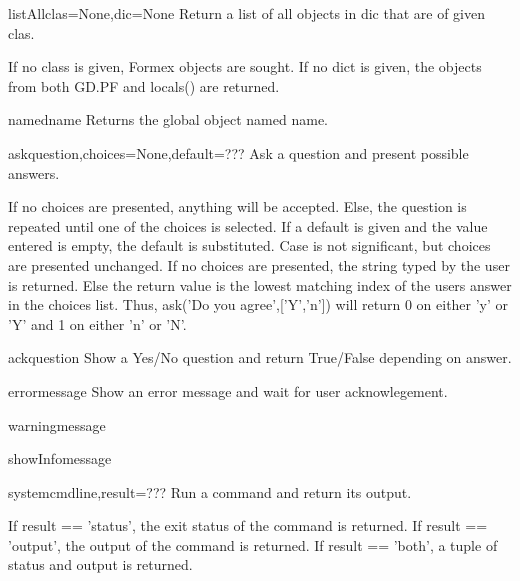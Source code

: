 \begin{funcdesc}{listAll}{clas=None,dic=None}
Return a list of all objects in dic that are of given clas.

    If no class is given, Formex objects are sought.
    If no dict is given, the objects from both GD.PF and locals()
    are returned.
    

\end{funcdesc}


\begin{funcdesc}{named}{name}
Returns the global object named name.

\end{funcdesc}


\begin{funcdesc}{ask}{question,choices=None,default=???}
Ask a question and present possible answers.

    If no choices are presented, anything will be accepted.
    Else, the question is repeated until one of the choices is selected.
    If a default is given and the value entered is empty, the default is
    substituted.
    Case is not significant, but choices are presented unchanged.
    If no choices are presented, the string typed by the user is returned.
    Else the return value is the lowest matching index of the users answer
    in the choices list. Thus, ask('Do you agree',['Y','n']) will return
    0 on either 'y' or 'Y' and 1 on either 'n' or 'N'.
    

\end{funcdesc}


\begin{funcdesc}{ack}{question}
Show a Yes/No question and return True/False depending on answer.

\end{funcdesc}


\begin{funcdesc}{error}{message}
Show an error message and wait for user acknowlegement.

\end{funcdesc}


\begin{funcdesc}{warning}{message}


\end{funcdesc}


\begin{funcdesc}{showInfo}{message}


\end{funcdesc}


\begin{funcdesc}{system}{cmdline,result=???}
Run a command and return its output.

    If result == 'status', the exit status of the command is returned.
    If result == 'output', the output of the command is returned.
    If result == 'both', a tuple of status and output is returned.
    

\end{funcdesc}


